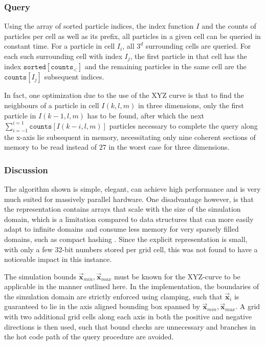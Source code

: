 \documentclass[oneside, a4paper]{book}
\newcommand\vek[1]{\vec{\bm{#1}}}
\begin{document}
\begin{appendices}
    \subsubsection{Query}
    Using the array of sorted particle indices, the index function $I$ and the counts of particles per cell as well as its prefix, all particles in a given cell can be queried in constant time. For a particle in cell $I_i$, all $3^d$ surrounding cells are queried. For each such surrounding cell with index $I_j$, the first particle in that cell has the index $\texttt{sorted}[\texttt{counts}_<]$ and the remaining particles in the same cell are the $\texttt{counts}[I_j]$ subsequent indices. 

    In fact, one optimization due to the use of the XYZ curve is that to find the neighbours of a particle in cell $I(k,l,m)$ in three dimensions, only the first particle in $I(k-1, l, m)$ has to be found, after which the next $\sum_{i=-1}^{i=1}\texttt{counts}[I(k-i,l,m)]$ particles necessary to complete the query along the x-axis lie subsequent in memory, necessitating only nine coherent sections of memory to be read instead of $27$ in the worst case for three dimensions.

    \subsubsection{Discussion}
    The algorithm shown \autocite{hoetzlein-rama-counting-sort} is simple, elegant, can achieve high performance and is very much suited for massively parallel hardware. One disadvantage however, is that the representation contains arrays that scale with the size of the simulation domain, which is a limitation compared to data structures that can more easily adapt to infinite domains and consume less memory for very sparsely filled domains, such as compact hashing \autocites{tutorial2019}{compressed-neighbour-lists}. Since the explicit representation is small, with only a few 32-bit numbers stored per grid cell, this was not found to have a noticeable impact in this instance.

    The simulation bounds $\vek{x}_{min},\vek{x}_{max}$ must be known for the XYZ-curve to be applicable in the manner outlined here. In the implementation, the boundaries of the simulation domain are strictly enforced using clamping, such that $\vek{x}_i$ is guaranteed to lie in the axis aligned bounding box spanned by $\vek{x}_{min},\vek{x}_{max}$. A grid with two additional grid cells along each axis in both the positive and negative directions is then used, such that bound checks are unnecessary and branches in the hot code path of the query procedure are avoided.
    

\end{appendices}
\end{document}
